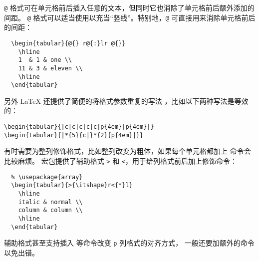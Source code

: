 \texttt{@} 格式可在单元格前后插入任意的文本，但同时它也消除了单元格前后额外添加的间距。
\texttt{@} 格式可以适当使用以充当“竖线”。特别地，\texttt{@}\marg*{} 可直接用来消除单元格前后的间距：
\clearpage
\begin{lstlisting}
  \begin{tabular}{@{} r@{:}lr @{}}
    \hline
    1  & 1 & one \\
    11 & 3 & eleven \\
    \hline
  \end{tabular}
\end{lstlisting}
\begin{center}
\end{center}
另外 \LaTeX{} 还提供了简便的将格式参数重复的写法 \texttt*{}，比如以下两种写法是等效的：
\begin{verbatim}
\begin{tabular}{|c|c|c|c|c|p{4em}|p{4em}|}
\begin{tabular}{|*{5}{c|}*{2}{p{4em}|}}
\end{verbatim}
有时需要为整列修饰格式，比如整列改变为粗体，如果每个单元格都加上  命令会比较麻烦。
 宏包提供了辅助格式 \texttt> 和 \texttt<，用于给列格式前后加上修饰命令：

\begin{lstlisting}
  % \usepackage{array}
  \begin{tabular}{>{\itshape}r<{*}l}
    \hline
    italic & normal \\
    column & column \\
    \hline
  \end{tabular}
\end{lstlisting}
\begin{center}
\end{center}

辅助格式甚至支持插入  等命令改变 \texttt{p} 列格式的对齐方式，
一般还要加额外的命令  以免出错。


